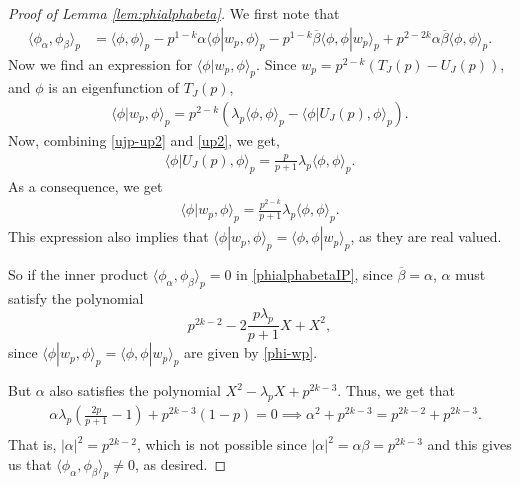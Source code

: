 \documentclass[11pt]{amsart}
\numberwithin{equation}{section}
\theoremstyle{plain}
\theoremstyle{definition}
\newcommand{\lan}{\langle }
\newcommand{\ran}{\rangle}
\begin{document}
\begin{proof}[Proof of Lemma \ref{lem:phialphabeta}]
We first note that
\begin{align}\label{phialphabetaIP}
    \lan \phi_\alpha, \phi_\beta\ran_p&=\lan \phi,\phi\ran_p - p^{1-k}\alpha\lan \phi|w_p, \phi\ran_p-p^{1-k}\overline{\beta}\lan \phi, \phi|w_p\ran_p+ p^{2-2k}\alpha\overline{\beta}\lan \phi, \phi\ran_p.
\end{align}
Now we find an expression for $\lan \phi|w_p, \phi\ran_p$. Since $w_p= p^{2-k}(T_J(p)-U_J(p))$, and $\phi$ is an eigenfunction of $T_J(p)$,  
\begin{align}
\lan \phi|w_p, \phi\ran_p= p^{2-k}(\lambda_p\lan \phi, \phi\ran_p -\lan \phi|U_J(p), \phi\ran_p).
\end{align}
%
Now, combining \eqref{ujp-up2} and \eqref{up2}, we get,
\begin{align}
    \lan \phi|U_J(p), \phi\ran_p= \frac{p}{p+1}\lambda_p \lan\phi, \phi\ran_p.
\end{align}
As a consequence, we get
\begin{align} \label{phi-wp}
    \lan \phi|w_p, \phi\ran_p= \frac{p^{2-k}}{p+1}\lambda_p \lan \phi, \phi\ran_p.
\end{align}
This expression also implies that $\lan \phi|w_p, \phi\ran_p= \lan \phi, \phi|w_p\ran_p$, as they are real valued.


So if the inner product $ \lan \phi_\alpha, \phi_\beta\ran_p=0$ in \eqref{phialphabetaIP}, since $\overline{\beta}=\alpha$, $\alpha$ must satisfy the polynomial
\begin{equation}
    p^{2k-2}- 2\frac{p\lambda_p}{p+1} X+ X^2,
\end{equation}
since $\lan \phi|w_p, \phi\ran_p= \lan \phi, \phi|w_p\ran_p$ are given by \eqref{phi-wp}.

But $\alpha$ also satisfies the polynomial $X^2-\lambda_p X+ p^{2k-3}$. Thus, we get that
\begin{align}
    &\alpha\lambda_p\left(\frac{2p}{p+1}-1\right)+p^{2k-3}(1-p)=0\implies \alpha^2+p^{2k-3}= p^{2k-2}+p^{2k-3}.\\
\end{align}
That is, $|\alpha|^2= p^{2k-2}$, which is not possible since $|\alpha|^2=\alpha\beta=p^{2k-3}$ and this gives us that $\lan \phi_\alpha, \phi_\beta\ran_p\neq 0$, as desired.
\end{proof}
\printbibliography
\end{document}
